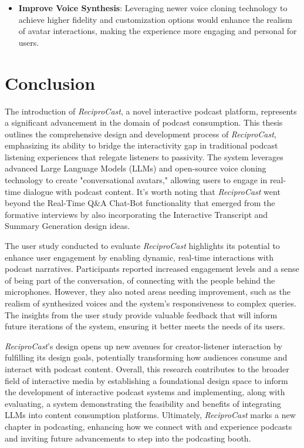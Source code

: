 \documentclass[12pt]{report}
\begin{document}
\begin{myfont}
\begin{itemize}
            \item \textbf{Improve Voice Synthesis}: Leveraging newer voice cloning technology to achieve higher fidelity and customization options would enhance the realism of avatar interactions, making the experience more engaging and personal for users.
        \end{itemize}
        \clearpage

        \chapter{Conclusion}
        The introduction of \textit{ReciproCast}, a novel interactive podcast platform, represents a significant advancement in the domain of podcast consumption. This thesis outlines the comprehensive design and development process of \textit{ReciproCast}, emphasizing its ability to bridge the interactivity gap in traditional podcast listening experiences that relegate listeners to passivity. The system leverages advanced Large Language Models (LLMs) and open-source voice cloning technology to create "conversational avatars," allowing users to engage in real-time dialogue with podcast content. It's worth noting that \textit{ReciproCast} went beyond the Real-Time Q\&A Chat-Bot functionality that emerged from the formative interviews by also incorporating the Interactive Transcript and Summary Generation design ideas.

        \indent The user study conducted to evaluate \textit{ReciproCast} highlights its potential to enhance user engagement by enabling dynamic, real-time interactions with podcast narratives. Participants reported increased engagement levels and a sense of being part of the conversation, of connecting with the people behind the microphones. However, they also noted areas needing improvement, such as the realism of synthesized voices and the system's responsiveness to complex queries. The insights from the user study provide valuable feedback that will inform future iterations of the system, ensuring it better meets the needs of its users.
        
        \indent \textit{ReciproCast}'s design opens up new avenues for creator-listener interaction by fulfilling its design goals, potentially transforming how audiences consume and interact with podcast content. Overall, this research contributes to the broader field of interactive media by establishing a foundational design space to inform the development of interactive podcast systems and implementing, along with evaluating, a system demonstrating the feasibility and benefits of integrating LLMs into content consumption platforms. Ultimately, \textit{ReciproCast} marks a new chapter in podcasting, enhancing how we connect with and experience podcasts and inviting future advancements to step into the podcasting booth.
        \clearpage


\end{myfont}
\end{document}
